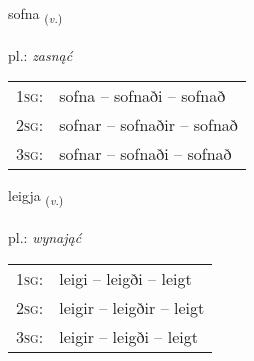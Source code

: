 \documentclass[frontgrid, backgrid]{flacards}\usepackage[]{graphicx}\usepackage[]{xcolor}
\begin{document}
\renewcommand{\flhead}{\vskip5pt \fboxsep=0pt {\small\bfseries\footnotesize Sagnorð | czasownik}}
\renewcommand{\fcfoot}{\vskip5pt \fboxsep=0pt \hspace{2pt}{\small\bfseries\footnotesize 3K}}

\renewcommand{\blhead}{\vskip5pt {\small\bfseries\footnotesize Sagnorð | czasownik }}
\renewcommand{\bcfoot}{\vskip5pt \hspace{2pt}{\small\bfseries\footnotesize 3K}}


{sofna \small{\textsubscript{(\textit{v.})}} \\[1ex] %
\textphonetic{[sɔpna]} \\
pl.: \emph{zasnąć} \\  [2ex]
\renewcommand*{\arraystretch}{0.8}
\begin{tabular}{p{1cm}l}
\textsc{1sg}: & sofna -- sofnaði -- sofnað \\ 
\textsc{2sg}: & sofnar -- sofnaðir -- sofnað \\ 
\textsc{3sg}: & sofnar -- sofnaði -- sofnað \\ 
\end{tabular}
}

\renewcommand{\flhead}{\vskip5pt \fboxsep=0pt {\small\bfseries\footnotesize Sagnorð | czasownik}}
\renewcommand{\fcfoot}{\vskip5pt \fboxsep=0pt \hspace{2pt}{\small\bfseries\footnotesize 3K}}

\renewcommand{\blhead}{\vskip5pt {\small\bfseries\footnotesize Sagnorð | czasownik }}
\renewcommand{\bcfoot}{\vskip5pt \hspace{2pt}{\small\bfseries\footnotesize 3K}}


{leigja \small{\textsubscript{(\textit{v.})}} \\[1ex] %
\textphonetic{[leija]} \\
pl.: \emph{wynająć} \\  [2ex]
\renewcommand*{\arraystretch}{0.8}
\begin{tabular}{p{1cm}l}
\textsc{1sg}: & leigi -- leigði -- leigt \\ 
\textsc{2sg}: & leigir -- leigðir -- leigt \\ 
\textsc{3sg}: & leigir -- leigði -- leigt \\ 
\end{tabular}
}
\end{document}
